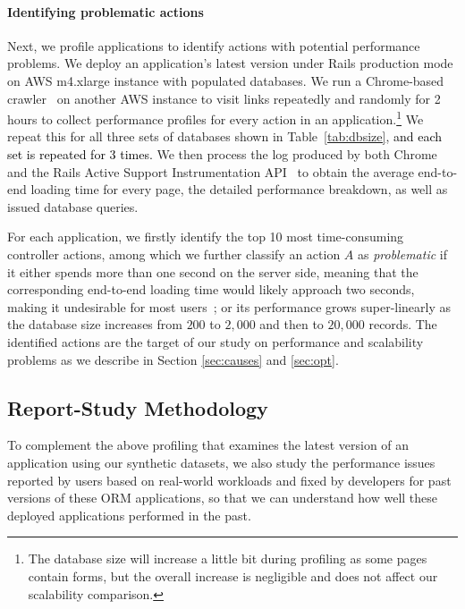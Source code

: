 \paragraph{\bf Identifying problematic actions}
Next, we profile applications to identify actions with potential performance problems. We deploy an application's latest version under Rails production mode on AWS m4.xlarge instance \cite{aws} with populated databases. We run a Chrome-based crawler~\cite{browser} on another AWS instance
to visit links repeatedly and randomly for 2 hours to collect performance profiles for every action in an application.\footnote{The database size will increase a little bit during profiling as some pages contain forms, but the overall increase is negligible and does not affect our scalability comparison.} We repeat this for all three sets of databases shown in Table~\ref{tab:dbsize}, \textcolor{black}{ and each set is repeated for 3 times.}
We then process the log produced by both Chrome and the 
Rails Active Support Instrumentation API~\cite{activesupport} to
obtain the average end-to-end loading time for every page, the detailed performance breakdown, as well as issued database queries.


For each application, we firstly identify the top 10 most time-consuming controller actions, among which we further classify an action $A$ as {\em problematic} if it either  
spends more than one second on the server side, meaning that the corresponding end-to-end loading time would likely approach two seconds,  making it undesirable for most users~\cite{akamai2011}; or
its performance grows super-linearly as the database size increases from $200$ to $2,000$ and then to $20,000$ records.
The identified actions are the target of our study on performance and scalability problems as we describe in Section \ref{sec:causes}
and \ref{sec:opt}.


\subsection{Report-Study Methodology}
To complement the above profiling that examines the latest version of an application using our synthetic datasets, we also study the performance issues
reported by users based on real-world workloads and fixed by developers for past versions of these ORM applications, so that we can understand how well these deployed applications performed in the past.

